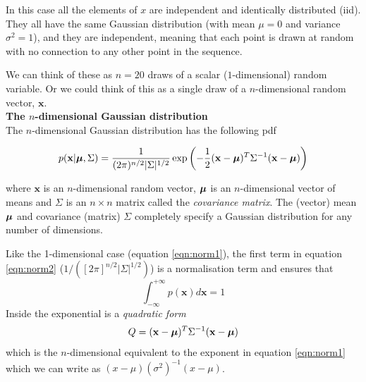 \documentclass[a4paper,11pt]{article}\usepackage[]{graphicx}\usepackage[]{color}
\def\bmu{{\mbox{\boldmath $\mu$}}}
\begin{document}
In this case all the elements of $x$ are independent and identically distributed (iid). They all have the same Gaussian distribution (with mean $\mu=0$ and variance $\sigma^2=1$), and they are independent, meaning that each point is drawn at random with no connection to any other point in the sequence.

We can think of these as $n=20$ draws of a scalar ($1$-dimensional) random variable. Or we could think of this as a single draw of a $n$-dimensional random vector, $\mathbf{x}$.\\
  
\vspace{0.4cm}
\textbf{The $n$-dimensional Gaussian distribution}\\

The $n$-dimensional Gaussian distribution has the following pdf

\begin{equation}
p(\mathbf{x}|\bmu, \Sigma) = \frac{1}{ (2 \pi)^{n/2} |\Sigma|^{1/2} } 
                 \exp \left( -\frac{1}{2} (\mathbf{x} - \bmu)^T
                 \Sigma^{-1} (\mathbf{x} - \bmu) \right)
\label{eqn:norm2}
\end{equation}
  
where $\mathbf{x}$ is an $n$-dimensional random vector, $\bmu$ is an $n$-dimensional vector of means and $\Sigma$ is an $n \times n$ matrix called the \emph{covariance matrix}. The (vector) mean $\bmu$ and covariance (matrix) $\Sigma$ completely specify a Gaussian distribution for any number of dimensions.

Like the 1-dimensional case (equation \ref{eqn:norm1}), the first term in equation \ref{eqn:norm2} ($1/([2 \pi ]^{n/2} |\Sigma|^{1/2} )$) is a normalisation term and ensures that
\begin{equation}
  \int_{-\infty}^{+\infty} p(\mathbf{x}) d\mathbf{x} = 1
\end{equation}
Inside the exponential is a \emph{quadratic form} 
\begin{equation}
 Q = (\mathbf{x} - \bmu)^T \Sigma^{-1} (\mathbf{x} - \bmu)
\end{equation}
which is the $n$-dimensional equivalent to the exponent in equation \ref{eqn:norm1} which we can write as $(x-\mu)(\sigma^2)^{-1}(x-\mu)$. 
\end{document}
